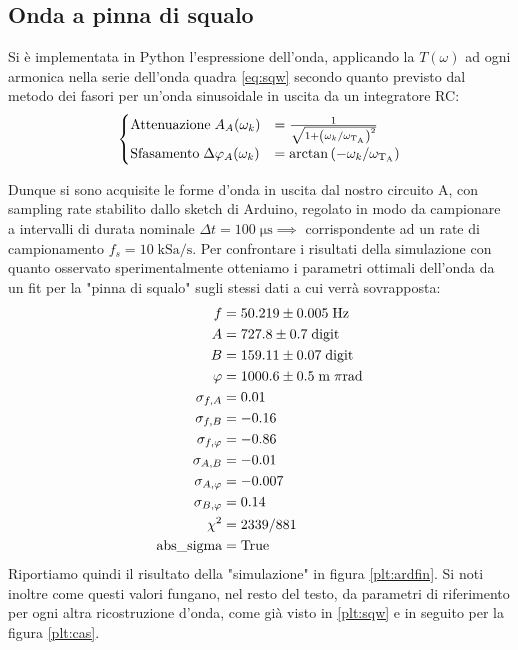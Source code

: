 \documentclass{article}[a4paper, oneside ,11pt]
\begin{document}
\subsection{Onda a pinna di squalo}
Si è implementata in Python l'espressione dell'onda, applicando la $T(\omega)$ ad ogni armonica nella serie dell'onda quadra \eqref{eq:sqw} secondo quanto previsto dal metodo dei fasori per un'onda sinusoidale in uscita da un integratore RC:
\begin{align}\label{eq:fin}
\begin{cases}
\mathrm{Attenuazione} \; A_A(\omega_k) &=  \frac{1}{\sqrt{1 + \left(\omega_k/\omega_{\rm T_A} \right)^2}} \\
\mathrm{Sfasamento} \; \Delta \phi_A(\omega_k) &= \arctan{\left(- \omega_k /\omega_{\rm T_A}\right)} 
\end{cases}
\end{align}

Dunque si sono acquisite le forme d'onda in uscita dal nostro circuito A, con sampling rate stabilito dallo sketch di Arduino, regolato in modo da campionare a intervalli di durata nominale $\Delta t = 100 \; \si{\micro\second} \implies$ corrispondente ad un rate di campionamento $f_s = 10 \; \mathrm{kSa/s}$.
Per confrontare i risultati della simulazione con quanto osservato sperimentalmente otteniamo i parametri ottimali dell'onda da un fit per la "pinna di squalo" sugli stessi dati a cui verrà sovrapposta:\\
\begin{align*}
f &= 50.219 \pm 0.005 \; \rm Hz \\
A &= 727.8 \pm 0.7 \; \rm digit \\
B &= 159.11 \pm 0.07 \; \rm digit \\
\phi &= 1000.6 \pm 0.5 \; \mathrm{m}\; \pi \si{\radian} \\
\sigma_{f, A} &= 0.01 \\   
\sigma_{f, B} &= -0.16 \\
\sigma_{f, \phi} &= -0.86 \\
\sigma_{A, B} &= -0.01 \\
\sigma_{A, \phi} &= -0.007 \\   
\sigma_{B, \phi} &= 0.14 \\
\chi^2 &= 2339/881 \\
\text{abs\_sigma} &= \rm True
\end{align*}
Riportiamo quindi il risultato della "simulazione" in figura \ref{plt:ardfin}. Si noti inoltre come questi valori fungano, nel resto del testo, da parametri di riferimento per ogni altra ricostruzione d'onda, come già visto in \ref{plt:sqw} e in seguito per la figura \ref{plt:cas}.\\
\end{document}
